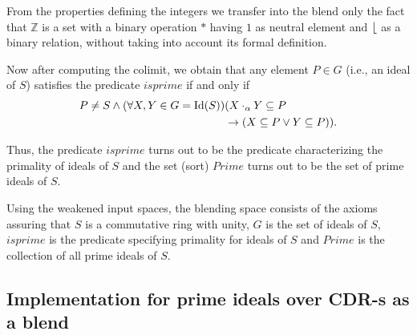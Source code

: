 From the properties defining the integers we
transfer into the blend only the fact that $\mathbb{Z}$ is a set with
a binary operation $*$ having $1$ as neutral element and
$\lfloor$ as a binary relation, without taking into account its formal definition.


Now after computing the colimit, we obtain that
any element $P \in G$
(i.e., an ideal of $S$) satisfies the predicate $isprime$ if and only
if
\begin{align*}
P\neq S \wedge (\forall X,Y\in G={\rm Id}(S)) & (X\cdot_{\alpha}Y\subseteq P\\
                             & \rightarrow (X\subseteq P \vee Y\subseteq P)).
\end{align*}

Thus, the predicate $isprime$ turns out to be the
predicate characterizing the primality of ideals of $S$ and the set
(sort) $Prime$ turns out to be the set of prime ideals of $S$.


Using the weakened input spaces, the blending space consists of the
axioms assuring that $S$ is a commutative ring with unity, $G$ is the
set of ideals of $S$, $isprime$ is the predicate specifying primality
for ideals of $S$ and $Prime$ is the collection of all prime ideals of
$S$.


\subsection{Implementation for prime ideals over CDR-s as a blend}\label{implementation}

